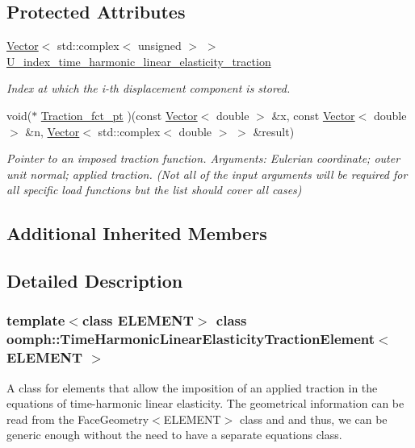 \subsection*{Protected Attributes}
\begin{DoxyCompactItemize}
\item 
\hyperlink{classoomph_1_1Vector}{Vector}$<$ std\+::complex$<$ unsigned $>$ $>$ \hyperlink{classoomph_1_1TimeHarmonicLinearElasticityTractionElement_a7c6aee602cc8d4d6084ea2bb4f43fe92}{U\+\_\+index\+\_\+time\+\_\+harmonic\+\_\+linear\+\_\+elasticity\+\_\+traction}
\begin{DoxyCompactList}\small\item\em Index at which the i-\/th displacement component is stored. \end{DoxyCompactList}\item 
void($\ast$ \hyperlink{classoomph_1_1TimeHarmonicLinearElasticityTractionElement_a3d2ab9d7d06924902ee589e17a8449a9}{Traction\+\_\+fct\+\_\+pt} )(const \hyperlink{classoomph_1_1Vector}{Vector}$<$ double $>$ \&x, const \hyperlink{classoomph_1_1Vector}{Vector}$<$ double $>$ \&n, \hyperlink{classoomph_1_1Vector}{Vector}$<$ std\+::complex$<$ double $>$ $>$ \&result)
\begin{DoxyCompactList}\small\item\em Pointer to an imposed traction function. Arguments\+: Eulerian coordinate; outer unit normal; applied traction. (Not all of the input arguments will be required for all specific load functions but the list should cover all cases) \end{DoxyCompactList}\end{DoxyCompactItemize}
\subsection*{Additional Inherited Members}


\subsection{Detailed Description}
\subsubsection*{template$<$class E\+L\+E\+M\+E\+NT$>$\newline
class oomph\+::\+Time\+Harmonic\+Linear\+Elasticity\+Traction\+Element$<$ E\+L\+E\+M\+E\+N\+T $>$}

A class for elements that allow the imposition of an applied traction in the equations of time-\/harmonic linear elasticity. The geometrical information can be read from the Face\+Geometry$<$\+E\+L\+E\+M\+E\+N\+T$>$ class and and thus, we can be generic enough without the need to have a separate equations class. 

